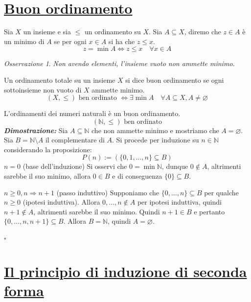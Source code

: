 \documentclass[oneside]{book}
\theoremstyle{remark}
\newtheorem*{osservaz}{Osservazione}
\newcommand{\teorema}[1]{\section{\underline{#1}}}
\newcommand{\cvd}{\begin{flushright}$\square$\end{flushright}} %
\begin{document}
\teorema{Buon ordinamento}
\begin{tcolorbox}[colback=yellow!30, colframe=yellow!30!black, title=Minimo]
Sia $X$ un insieme e sia $\leq$ un ordinamento su $X$. Sia $A \subseteq X$, diremo
che $z \in A$ è un minimo di $A$ se per ogni $x \in A$ si ha che $z \leq x$.
\[ z = \min A \Longleftrightarrow z \leq x \quad \forall x \in A \]
\end{tcolorbox}

\begin{osservaz}
\emph{Non avendo elementi, l'insieme vuoto non ammette minimo.}
\end{osservaz}

\begin{tcolorbox}[colback=yellow!30, colframe=yellow!30!black, title=Insieme ben ordinato]
Un ordinamento totale su un insieme $X$ si dice buon ordinamento se ogni sottoinsieme
non vuoto di $X$ ammette minimo.
\[ (X,\leq) \text{ ben ordinato } \Longleftrightarrow \exists \min A \quad \forall A \subseteq X, A \not = \varnothing \]
\end{tcolorbox}

\begin{tcolorbox}[title={Buon ordinamento di $\mathbb{N}$}]
L'ordinamenti dei numeri naturali è un buon ordinamento.
\[ (\mathbb{N},\leq) \text{ ben ordinato} \]
\emph{\textbf{Dimostrazione:}} Sia $A \subseteq \mathbb{N}$ che non
ammette minimo e mostriamo che $A = \varnothing$.
Sia $B = \mathbb{N}\setminus A$ il complementare di $A$. Si procede per induzione su
$n \in \mathbb{N}$ considerando la proposizione:
\[ P(n) := \left(\{0,1,...,n\} \subseteq B\right) \]
$n=0$ (base dell'induzione) Si osservi che $0 = \min\mathbb{N}$, dunque
$0 \not \in A$, altrimenti sarebbe il suo minimo,
allora $0 \in B$ e di conseguenza $\{0\} \subseteq B$.

$n\geq0, n\Longrightarrow n+1$ (passo induttivo)
Supponiamo che $\{0,...,n\} \subseteq B$ per qualche $n\geq0$ (ipotesi
induttiva). Allora
$0,...,n \not \in A$ per ipotesi induttiva, quindi $n+1 \not \in A$,
altrimenti sarebbe il suo minimo. Quindi $n+1 \in B$ e pertanto
$\{0,...,n,n+1\} \subseteq B$. Allora $B = \mathbb{N}$, quindi
$A = \varnothing$.
\cvd
\end{tcolorbox}

\teorema{Il principio di induzione di seconda forma}
\end{document}
